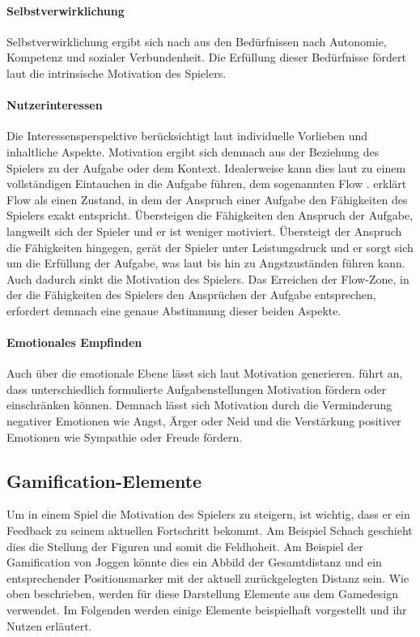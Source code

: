 \documentclass[
	oneside,  %
	ngerman, 
	final, 
	11pt, 
	a4paper, 
	1.1headlines, 
	headinclude=false, 
	footinclude=false, 
	mpinclude=false, 
	pagesize, 
	onecolumn, 
	titlepage, 
	parskip=half, 
	headsepline, 
	chapterprefix=false, 
	version=first, 
	listof=totoc, 
	bibliography=totoc, 
	toc=graduated, 
	fleqn
]{scrbook}
\begin{document}
\paragraph{Selbstverwirklichung}
Selbstverwirklichung ergibt sich nach \cite{SH2014} aus den Bedürfnissen nach Autonomie, Kompetenz und sozialer Verbundenheit.
Die Erfüllung dieser Bedürfnisse fördert laut \cite{SH2014} die intrinsische Motivation des Spielers.

\paragraph{Nutzerinteressen}
Die Interessensperspektive berücksichtigt laut \cite{SH2014} individuelle Vorlieben und inhaltliche Aspekte.
Motivation ergibt sich demnach aus der Beziehung des Spielers zu der Aufgabe oder dem Kontext.
Idealerweise kann dies laut \cite{SH2014} zu einem vollständigen Eintauchen in die Aufgabe führen, dem sogenannten \glqq Flow \grqq{}.
\cite{Zi2011} erklärt Flow als einen Zustand, in dem der Anspruch einer Aufgabe den Fähigkeiten des Spielers exakt entspricht.
Übersteigen die Fähigkeiten den Anspruch der Aufgabe, langweilt sich der Spieler und er ist weniger motiviert. Übersteigt der Anspruch die Fähigkeiten hingegen, gerät der Spieler unter Leistungsdruck und er sorgt sich um die Erfüllung der Aufgabe, was laut \cite{As2000} bis hin zu Angstzuständen führen kann.
Auch dadurch sinkt die Motivation des Spielers.
Das Erreichen der Flow-Zone, in der die Fähigkeiten des Spielers den Ansprüchen der Aufgabe entsprechen, erfordert demnach eine genaue Abstimmung dieser beiden Aspekte.

\paragraph{Emotionales Empfinden}
Auch über die emotionale Ebene lässt sich laut \cite{SH2014} Motivation generieren.
\cite{As2000} führt an, dass unterschiedlich formulierte Aufgabenstellungen Motivation fördern oder einschränken können.
Demnach lässt sich Motivation durch die Verminderung negativer Emotionen wie Angst, Ärger oder Neid und die Verstärkung positiver Emotionen wie Sympathie oder Freude fördern.

\subsection{Gamification-Elemente}
\label{Elemente}
Um in einem Spiel die Motivation des Spielers zu steigern, ist wichtig, dass er ein Feedback zu seinem aktuellen Fortschritt bekommt.
Am Beispiel Schach geschieht dies die Stellung der Figuren und somit die Feldhoheit.
Am Beispiel der Gamification von Joggen könnte dies ein Abbild der Gesamtdistanz und ein entsprechender Positionsmarker mit der aktuell zurückgelegten Distanz sein.
Wie oben beschrieben, werden für diese Darstellung Elemente aus dem Gamedesign verwendet.
Im Folgenden werden einige Elemente beispielhaft vorgestellt und ihr Nutzen erläutert.
\end{document}
